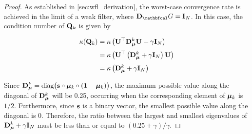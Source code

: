 \begin{proof}
    As established in \cref{sec:wfl_derivation}, the worst-case convergence rate is achieved in the limit of a weak filter, where $\D_\Gt = \I_N$. In this case, the condition number of $\mathbf{Q}_k$ is given by 

    \begin{align*}
        \kappa(\mathbf{Q}_k) &= \kappa\left( \mathbf{U}^\top \mathbf{D}_{\boldsymbol{\mu}}^k \mathbf{U} + \gamma \mathbf{I}_N\right) \\[0.1cm]
        &=  \kappa\left( \mathbf{U}^\top \left(\mathbf{D}_{\boldsymbol{\mu}}^k + \gamma \mathbf{I}_N\right) \mathbf{U}  \right) \\[0.1cm]
        &= \kappa\left( \mathbf{D}_{\boldsymbol{\mu}}^k + \gamma \mathbf{I}_N\right)
    \end{align*}

    Since $\mathbf{D}_{\boldsymbol{\mu}}^k = \text{diag}\big(\mathbf{s} \circ \boldsymbol{\mu}_k \circ (\mathbf{1} - \boldsymbol{\mu}_k)\big)$, the maximum possible value along the diagonal of $\mathbf{D}_{\boldsymbol{\mu}}^k$ will be 0.25, occurring when the corresponding element of $\boldsymbol{\mu}_k$ is $1/2$. Furthermore, since $\mathbf{s}$ is a binary vector, the smallest possible value along the diagonal is 0. Therefore, the ratio between the largest and smallest eigenvalues of $ \mathbf{D}_{\boldsymbol{\mu}}^k + \gamma \mathbf{I}_N$ must be less than or equal to $(0.25 + \gamma) / \gamma$. 
\end{proof}


